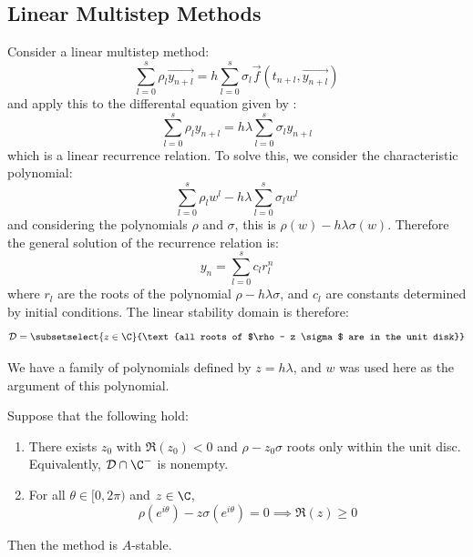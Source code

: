 \documentclass[../Main.tex]{subfiles}
\begin{document}
\subsection{Linear Multistep Methods}
Consider a linear multistep method:
\begin{equation*}
    \sum_{l=0}^{s} \rho_l \vec{y_{n + l}} = h\sum_{l=0}^{s} \sigma_l \vec{f}(t_{n + l}, \vec{y_{n + l}})
\end{equation*}
and apply this to the differental equation given by :
\begin{equation*}
    \sum_{l=0}^{s} \rho_l y_{n + l} = h \lambda \sum_{l=0}^{s} \sigma_l y_{n + l}
\end{equation*}
which is a linear recurrence relation. To solve this, we consider the characteristic polynomial:
\begin{equation*}
    \sum_{l=0}^{s} \rho_l w^l - h\lambda \sum_{l=0}^{s} \sigma_l w^l
\end{equation*}
and considering the polynomials $\rho$ and $\sigma$, this is $\rho(w) - h\lambda \sigma(w)$. Therefore the general solution of the recurrence relation is:
\begin{equation*}
    y_n = \sum_{l=0}^{s} c_l r_l^n
\end{equation*}
where $r_l$ are the roots of the polynomial $\rho - h\lambda \sigma$, and $c_l$ are constants determined by initial conditions. The linear stability domain is therefore:
\begin{equation*}
    \dom = \subsetselect{z \in \C}{\text{all roots of $\rho - z \sigma$ are in the unit disk}}
\end{equation*}
\begin{remark}
    We have a family of polynomials defined by $z = h\lambda$, and $w$ was used here as the argument of this polynomial.
\end{remark}
\begin{proposition}
    Suppose that the following hold:
    \begin{enumerate}
        \item There exists $z_0$ with $\Re(z_0) < 0$ and $\rho - z_0 \sigma$ roots only within the unit disc. Equivalently, $\dom \cap \C^-$ is nonempty.
        \item For all $\theta \in [0, 2\pi)$ and $z \in \C$,
            \begin{equation*}
                \rho(e^{i\theta}) - z\sigma(e^{i\theta}) = 0 \implies \Re(z) \geq 0
            \end{equation*}
    \end{enumerate}
    Then the method is $A$-stable.
    \label{propLinearMultStepLSD}
\end{proposition}
\end{document}
